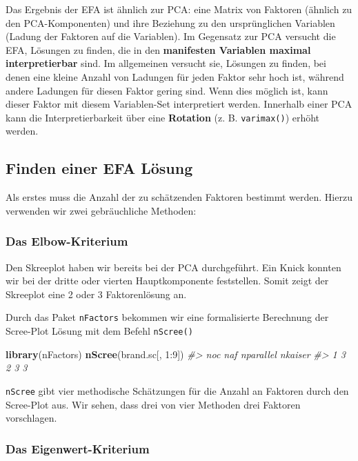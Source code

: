 \documentclass[12pt,]{book}
\makeatletter
\newenvironment{Shaded}{\begin{snugshade}}{\end{snugshade}}
\newcommand{\KeywordTok}[1]{\textcolor[rgb]{0.13,0.29,0.53}{\textbf{{#1}}}}
\newcommand{\DecValTok}[1]{\textcolor[rgb]{0.00,0.00,0.81}{{#1}}}
\newcommand{\CommentTok}[1]{\textcolor[rgb]{0.56,0.35,0.01}{\textit{{#1}}}}
\newcommand{\NormalTok}[1]{{#1}}
\newenvironment{kframe}{%
\medskip{}
\setlength{\fboxsep}{.8em}
 \def\at@end@of@kframe{}%
 \ifinner\ifhmode%
  \def\at@end@of@kframe{\end{minipage}}%
  \begin{minipage}{\columnwidth}%
 \fi\fi%
 \def\FrameCommand##1{\hskip\@totalleftmargin \hskip-\fboxsep
 \colorbox{shadecolor}{##1}\hskip-\fboxsep
     \hskip-\linewidth \hskip-\@totalleftmargin \hskip\columnwidth}%
 \MakeFramed {\advance\hsize-\width
   \@totalleftmargin\z@ \linewidth\hsize
   \@setminipage}}%
 {\par\unskip\endMakeFramed%
 \at@end@of@kframe}
\renewenvironment{Shaded}{\begin{kframe}}{\end{kframe}}
\makeatother
\begin{document}
Das Ergebnis der EFA ist ähnlich zur PCA: eine Matrix von Faktoren
(ähnlich zu den PCA-Komponenten) und ihre Beziehung zu den
ursprünglichen Variablen (Ladung der Faktoren auf die Variablen). Im
Gegensatz zur PCA versucht die EFA, Lösungen zu finden, die in den
\textbf{manifesten Variablen maximal interpretierbar} sind. Im
allgemeinen versucht sie, Lösungen zu finden, bei denen eine kleine
Anzahl von Ladungen für jeden Faktor sehr hoch ist, während andere
Ladungen für diesen Faktor gering sind. Wenn dies möglich ist, kann
dieser Faktor mit diesem Variablen-Set interpretiert werden. Innerhalb
einer PCA kann die Interpretierbarkeit über eine \textbf{Rotation} (z.
B. \texttt{varimax()}) erhöht werden.

\subsection{Finden einer EFA Lösung}\label{finden-einer-efa-losung}

Als erstes muss die Anzahl der zu schätzenden Faktoren bestimmt werden.
Hierzu verwenden wir zwei gebräuchliche Methoden:

\subsubsection{Das Elbow-Kriterium}\label{das-elbow-kriterium}

Den Skreeplot haben wir bereits bei der PCA durchgeführt. Ein Knick
konnten wir bei der dritte oder vierten Hauptkomponente feststellen.
Somit zeigt der Skreeplot eine 2 oder 3 Faktorenlösung an.

Durch das Paket \texttt{nFactors} bekommen wir eine formalisierte
Berechnung der Scree-Plot Lösung mit dem Befehl \texttt{nScree()}

\begin{Shaded}
\begin{Highlighting}[]
\KeywordTok{library}\NormalTok{(nFactors)}
\KeywordTok{nScree}\NormalTok{(brand.sc[, }\DecValTok{1}\NormalTok{:}\DecValTok{9}\NormalTok{])}
\CommentTok{#>   noc naf nparallel nkaiser}
\CommentTok{#> 1   3   2         3       3}
\end{Highlighting}
\end{Shaded}

\texttt{nScree} gibt vier methodische Schätzungen für die Anzahl an
Faktoren durch den Scree-Plot aus. Wir sehen, dass drei von vier
Methoden drei Faktoren vorschlagen.

\subsubsection{Das Eigenwert-Kriterium}\label{das-eigenwert-kriterium}
\end{document}
